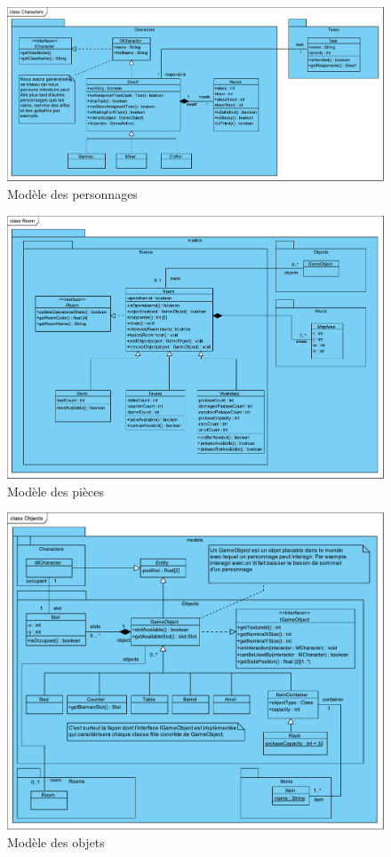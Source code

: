 \documentclass[a4paper]{report}
\begin{document}
\begin{figure}
    \center
    \includegraphics[scale=0.5]{img/class/Characters}
    \caption{Modèle des personnages}
		\label{Characters}
\end{figure}

\begin{figure}
    \center
    \includegraphics[scale=0.5]{img/class/Room}
    \caption{Modèle des pièces}
		\label{Rooms}
\end{figure}

\begin{figure}
    \center
    \includegraphics[scale=0.5]{img/class/Objects}
    \caption{Modèle des objets}
		\label{GameObjects}
\end{figure}
\end{document}
